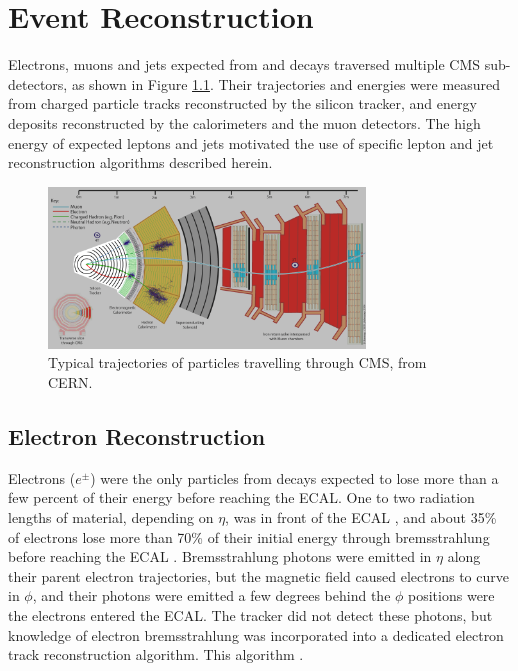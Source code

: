 \chapter{Event Reconstruction}
\label{sec:reco_chapter}

Electrons, muons and jets expected from \WR and \nul decays traversed multiple CMS sub-detectors, 
as shown in Figure \ref{fig:particleTrajectories}.  Their trajectories and energies were measured 
from charged particle tracks reconstructed by the silicon tracker, and energy deposits reconstructed 
by the calorimeters and the muon detectors.  The high energy of expected leptons and jets motivated 
the use of specific lepton and jet reconstruction algorithms described herein.

\begin{figure}[h]
	\centering
	\includegraphics[width=0.75\textwidth]{figures/flowOfParticlesThroughCMS.png}
	\caption{Typical trajectories of particles travelling through CMS, from CERN.}
	\label{fig:particleTrajectories}
\end{figure}


\section{Electron Reconstruction}
\label{sec:eleReco}
Electrons ($e^{\pm}$) were the only particles from \WR decays expected to lose more than a few percent of their 
energy before reaching the ECAL.  One to two radiation lengths of material, depending on $\eta$, was in front of 
the ECAL \cite{ecalPerformanceInCollisions}, and about 35\% of electrons lose more than 70\% of their initial energy 
through bremsstrahlung before reaching the ECAL \cite{trackerPerformanceInCollisions}.  Bremsstrahlung photons were emitted in $\eta$ along their parent electron 
trajectories, but the magnetic field caused electrons to curve in $\phi$, and their photons were emitted a few 
degrees behind the $\phi$ positions were the electrons entered the ECAL.  The tracker did not detect these photons, 
but knowledge of electron bremsstrahlung was incorporated into a dedicated electron track reconstruction algorithm.  
This algorithm .


